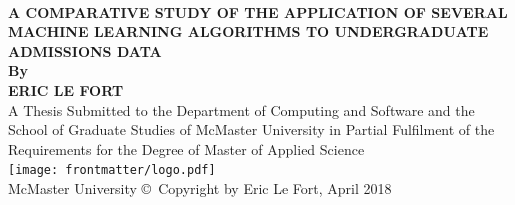 \begin{titlepage}
\begin{changemargin}{0cm}{-1.4cm}
\begin{center}
	\vspace{1cm}~\\
	\textbf{\Large A COMPARATIVE STUDY OF THE APPLICATION OF SEVERAL MACHINE LEARNING ALGORITHMS TO UNDERGRADUATE ADMISSIONS DATA}
	\vspace{2cm}~\\
	\textbf{By\\ ERIC LE FORT}
	\vspace{2cm}~\\
	A Thesis Submitted to the Department of Computing and Software and the School of Graduate Studies of McMaster University in Partial Fulfilment of the Requirements for the Degree of Master of Applied Science
	\vspace{1.8cm}~\\
	\texttt{[image: frontmatter/logo.pdf]}~\\
	\vspace{0.65cm}
	McMaster University \copyright~Copyright by Eric Le Fort, April 2018
\end{center}
\end{changemargin}
\end{titlepage}